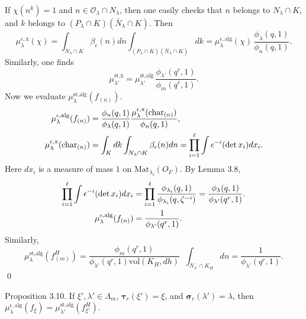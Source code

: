 \documentclass{amsart}
\begin{document}
If
  $ \chi (n^k) = 1 $ and $n\in {\mathcal O}_\lambda\cap N_\lambda$,
then one easily checks that
  $ n$ belongs to $N_{\lambda} \cap K $,
and
  $k$ belongs to  $(P_{\lambda} \cap K)
          (\bar N_{\lambda} \cap K) $.
Then 
%
$$
  \mu_{\lambda}^{\epsilon,\text{x}} (\chi) =
  \int_{N_{\lambda}\cap K}
  \beta_{\epsilon} (n) d n
  \int_{ (P_{\lambda}\cap K) 
         (\bar N_{\lambda}\cap K) }
  dk =
  \mu_{\lambda}^{\epsilon,\text{alg}} (\chi) \,
  \frac
    { \phi_\lambda(q,1)} {\phi_n(q,1)}.
$$
Similarly, one finds
%
$$
  \mu_{\lambda'}^{\text{st,x}} =
  \mu_{\lambda'}^{\text{st,alg}} \,
  \frac {\phi_{\lambda'}(q^r,1)} {\phi_m(q^r,1)}.
$$
Now we evaluate
  $ \mu_{\lambda}^{\text{st,alg}} (f_{(n)})$. 
%
\begin{align*}
 \mu_{\lambda}^{\epsilon,\text{alg}} (f_{(n)})
&=
  \frac {\phi_n(q,1)}{\phi_\lambda(q,1)}
  \frac
     {  \mu_{\lambda}^{\epsilon,\text{x}} (\text{char}_{(n)})  }
     {  \phi_n (q,1)  },  \\
\vspace{4pt}
  \mu_{\lambda}^{\epsilon,\text{x}} (\text{char}_{(n)})
&=
  \int_K dk 
  \int_{ N_{\lambda} \cap K }
  \beta_{\epsilon} (n)  d n =
  \prod_{i=1}^{\ell} 
  \int
  \epsilon^{-i}
  (\det x_i)
  d x_i.
\end{align*}
%
Here 
  $ d x_i $
is a measure of mass $1$ on
 $ \text{Mat}_{\lambda_i} (O_F) $. By Lemma 3.8,
%
\begin{align*}
  \prod_{i=1}^{\ell}
  \int
  \epsilon^{-i} (\det x_i)
  d x_i 
&=
  \prod_{i=1}^{\ell}
  \frac
     { \phi_{\lambda_i} (q,1)  }
     { \phi_{\lambda_i} (q,\zeta^{-i})  } 
= 
  \frac
     { \phi_{\lambda} (q,1)  }
     { \phi_{\lambda'} (q^r,1)  }. 
\\
\vspace{8pt}
  \mu_{\lambda}^{\epsilon,\text{alg} }
  (f_{(n)})
&=
  \frac{1} {\phi_{\lambda'}(q^r,1)}. 
\end{align*}
Similarly,
$$
  \mu_{\lambda}^{\text{st,alg}}
  (f_{(m)}^H)
=
  \frac 
  { \phi_m(q^r,1) } {\phi_{\lambda'}(q^r,1)
        \text{vol}(K_H, dh)   } \;\;
   \int_{  N_{\lambda'}\cap K_H }  
   d n
=
   \frac 1
       { \phi_{\lambda'} (q^r,1)   }.
$$
\qed\finishpproclaim
\bigskip

\proclaim Proposition {3.10}.
If
  $ \xi', \lambda' \in \Lambda_m $,
  $ \pmb\tau_r (\xi') = \xi $, and
  $ \pmb\sigma_r (\lambda') = \lambda$,
then
  $ \mu_{\lambda}^{\epsilon,\text{alg}}
    (f_{\xi}) = \mu_{\lambda'}^{\text{st,alg}}
    (f_{\xi'}^H) $.
\finishproclaim
\end{document}
